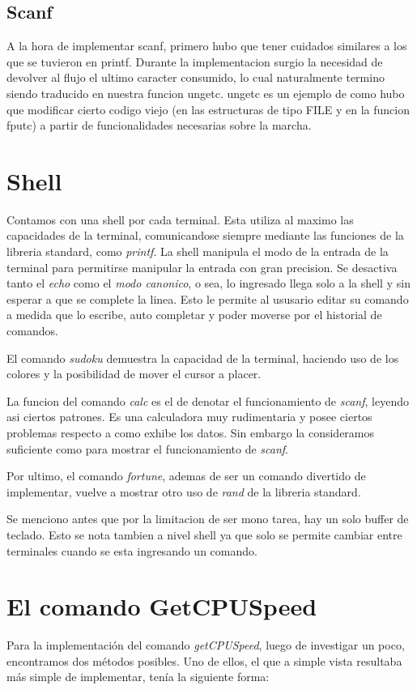 \documentclass[a4paper,10pt]{article}
\begin{document}
    \subsection{Scanf}    
        A la hora de implementar scanf, primero hubo que tener cuidados similares a los que se tuvieron en printf. Durante la implementacion surgio la necesidad de devolver al flujo el ultimo caracter consumido, lo cual naturalmente termino siendo traducido en nuestra funcion ungetc. ungetc es un ejemplo de como hubo que modificar cierto codigo viejo (en las estructuras de tipo FILE y en la funcion fputc) a partir de funcionalidades necesarias sobre la marcha.
\newpage
\section{Shell}
    Contamos con una shell por cada terminal.
    Esta utiliza al maximo las capacidades de la terminal, comunicandose siempre mediante las funciones de la libreria standard, como \textit{printf}.
    La shell manipula el modo de la entrada de la terminal para permitirse manipular la entrada con gran precision.
    Se desactiva tanto el \textit{echo} como el \textit{modo canonico}, o sea, lo ingresado llega solo a la shell y sin esperar a que se complete la linea.
    Esto le permite al ususario editar su comando a medida que lo escribe, auto completar y poder moverse por el historial de comandos.

    El comando \textit{sudoku} demuestra la capacidad de la terminal, haciendo uso de los colores y la posibilidad de mover el cursor a placer.
    
    La funcion del comando \textit{calc} es el de denotar el funcionamiento de \textit{scanf}, leyendo asi ciertos patrones.
    Es una calculadora muy rudimentaria y posee ciertos problemas respecto a como exhibe los datos.
    Sin embargo la consideramos suficiente como para mostrar el funcionamiento de \textit{scanf}.
    
    Por ultimo, el comando \textit{fortune}, ademas de ser un comando divertido de implementar, vuelve a mostrar otro uso de \textit{rand} de la libreria standard.

    Se menciono antes que por la limitacion de ser mono tarea, hay un solo buffer de teclado.
    Esto se nota tambien a nivel shell ya que solo se permite cambiar entre terminales cuando se esta ingresando un comando.

\newpage
\section{El comando GetCPUSpeed}
    Para la implementación del comando \textit{getCPUSpeed}, luego de investigar un poco, encontramos dos métodos posibles. Uno de ellos, el que a simple vista resultaba
    más simple de implementar, tenía la siguiente forma:
\end{document}
